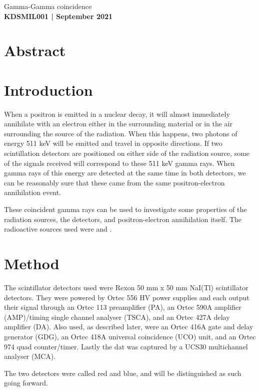 \documentclass[11pt]{article}
\numberwithin{equation}{section}
\numberwithin{figure}{section}
\numberwithin{table}{section}
\begin{document}
\begin{center}
    {\huge Gamma-Gamma coincidence}\\
    \vspace{0.2in}
    \textbf{KDSMIL001 | September 2021}
    
    \section*{Abstract}\label{sec:Abstract}
    
\end{center}

\section{Introduction}\label{sec:Introduction}
\par When a positron is emitted in a nuclear decay, it will almost immediately annihilate with an electron either in the surrounding material or in the air surrounding the source of the radiation. When this happens, two photons of energy 511 keV will be emitted and travel in opposite directions. If two scintillation detectors are positioned on either side of the radiation source, some of the signals received will correspond to these 511 keV gamma rays. When gamma rays of this energy are detected at the same time in both detectors, we can be reasonably sure that these came from the same positron-electron annihilation event. 
\par These coincident gamma rays can be used to investigate some properties of the radiation sources, the detectors, and positron-electron annihilation itself. The radioactive sources used were  and .

\section{Method}\label{sec:Method}
\par The scintillator detectors used were Rexon 50 mm x 50 mm NaI(Tl) scintillator detectors. They were powered by Ortec 556 HV power supplies and each output their signal through an Ortec 113 preamplifier (PA), an Ortec 590A amplifier (AMP)/timing single channel analyser (TSCA), and an Ortec 427A delay amplifier (DA). Also used, as described later, were an Ortec 416A gate and delay generator (GDG), an Ortec 418A universal coincidence (UCO) unit, and an Ortec 974 quad counter/timer. Lastly the dat was captured by a UCS30 multichannel analyser (MCA).
\par The two detectors were called red and blue, and will be distinguished as such going forward.
\end{document}
